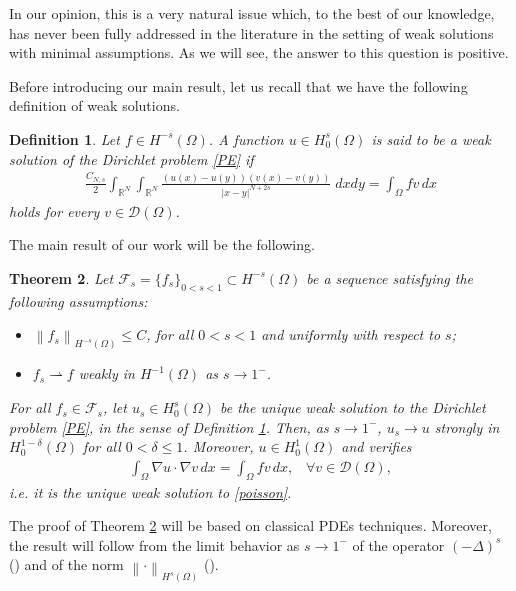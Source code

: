 \documentclass[reqno,twoside]{amsart}
\newtheorem{theorem}{Theorem}[section]
\newtheorem{definition}[theorem]{Definition}
\numberwithin{equation}{section}
\def\RR{{\mathbb{R}}}
\newcommand{\norm}[2]{{\left\|#1\right\|}_{#2}}
\newcommand{\fl}[2]{(-\Delta)^#1#2}
\begin{document}
In our opinion, this is a very natural issue which, to the best of our knowledge, has never been fully addressed in the literature in the setting of weak solutions with minimal assumptions. As we will see, the answer to this question is positive. 

Before introducing our main result, let us recall that we have the following definition of weak solutions. 

\begin{definition}\label{weak_sol_def}
	Let $f\in H^{-s}(\Omega)$. A function $u\in H_0^s(\Omega)$ is said to be a weak solution of the Dirichlet problem \eqref{PE} if 
	\begin{align}\label{weak-sol}
	\frac{C_{N,s}}{2}\int_{\RR^N}\int_{\RR^N}\frac{(u(x)-u(y))(v(x)-v(y))}{|x-y|^{N+2s}}\;dxdy = \int_\Omega  fv\,dx
	\end{align}
	holds for every $v\in\mathcal{D}(\Omega)$.
\end{definition}

The main result of our work will be the following.

\begin{theorem}\label{limit_thm}
	Let $\mathcal{F}_s=\{f_s\}_{0<s<1}\subset H^{-s}(\Omega)$ be a sequence satisfying the following assumptions:
	\begin{itemize}
		\item[$\textbf{H1}$] $\norm{f_s}{H^{-s}(\Omega)}\leq C$, for all $0<s<1$ and uniformly with respect to $s$;
		
		\item[$\textbf{H2}$] $f_s\rightharpoonup f$ weakly in $H^{-1}(\Omega)$ as $s\to 1^-$.
	\end{itemize}		
	For all $f_s\in\mathcal{F}_s$, let $u_s\in H^s_0(\Omega)$ be the unique weak solution to the Dirichlet problem \eqref{PE}, in the sense of Definition \ref{weak_sol_def}. Then, as $s\to 1^-$, $u_s\to u$ strongly in $H^{1-\delta}_0(\Omega)$ for all $0<\delta\leq 1$. Moreover, $u\in H^1_0(\Omega)$ and verifies
\begin{align*}
	\int_{\Omega} \nabla u\cdot\nabla v\,dx = \int_{\Omega}fv\,dx, \;\;\; \forall v\in\mathcal{D}(\Omega),
\end{align*}
i.e. it is the unique weak solution to \eqref{poisson}.
\end{theorem}

The proof of Theorem \ref{limit_thm} will be based on classical PDEs techniques. Moreover, the result will follow from the limit behavior as $s\to 1^-$ of the operator $\fl{s}{}$ (\cite{dihitchhiker,stinga2010extension}) and of the norm $\norm{\cdot}{H^s(\Omega)}$ (\cite{bourgain2001another}).
\end{document}
